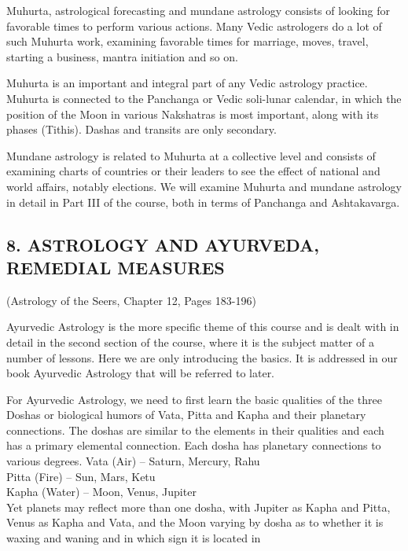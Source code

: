  

Muhurta, astrological forecasting and mundane astrology consists of looking for favorable times to perform various actions. Many Vedic astrologers do a lot of such Muhurta work, examining favorable times for marriage, moves, travel, starting a business, mantra initiation and so on.

 

Muhurta is an important and integral part of any Vedic astrology practice. Muhurta is connected to the Panchanga or Vedic soli-lunar calendar, in which the position of the Moon in various Nakshatras is most important, along with its phases (Tithis). Dashas and transits are only secondary.

 

Mundane astrology is related to Muhurta at a collective level and consists of examining charts of countries or their leaders to see the effect of national and world affairs, notably elections. We will examine Muhurta and mundane astrology in detail in Part III of the course, both in terms of Panchanga and Ashtakavarga.

 

\subsection{8. ASTROLOGY AND AYURVEDA, REMEDIAL MEASURES} (Astrology of the Seers, Chapter 12, Pages 183-196)


Ayurvedic Astrology is the more specific theme of this course and is dealt with in detail in the second section of the course, where it is the subject matter of a number of lessons. Here we are only introducing the basics. It is addressed in our book Ayurvedic Astrology that will be referred to later.

For Ayurvedic Astrology, we need to first learn the basic qualities of the three Doshas or biological humors of Vata, Pitta and Kapha and their planetary connections. The doshas are similar to the elements in their qualities and each has a primary elemental connection. Each dosha has planetary connections to various degrees.
Vata (Air) – Saturn, Mercury, Rahu\\
Pitta (Fire) – Sun, Mars, Ketu\\
Kapha (Water) – Moon, Venus, Jupiter\\
Yet planets may reflect more than one dosha, with Jupiter as Kapha and Pitta, Venus as Kapha and Vata, and the Moon varying by dosha as to whether it is waxing and waning and in which sign it is located in

